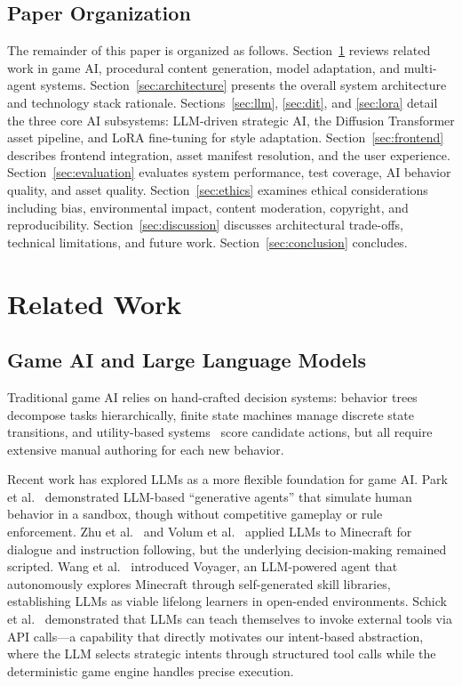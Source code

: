 \documentclass[conference]{IEEEtran}
\begin{document}
\subsection{Paper Organization}

The remainder of this paper is organized as follows. Section~\ref{sec:related} reviews related work in game AI, procedural content generation, model adaptation, and multi-agent systems. Section~\ref{sec:architecture} presents the overall system architecture and technology stack rationale. Sections~\ref{sec:llm}, \ref{sec:dit}, and \ref{sec:lora} detail the three core AI subsystems: LLM-driven strategic AI, the Diffusion Transformer asset pipeline, and LoRA fine-tuning for style adaptation. Section~\ref{sec:frontend} describes frontend integration, asset manifest resolution, and the user experience. Section~\ref{sec:evaluation} evaluates system performance, test coverage, AI behavior quality, and asset quality. Section~\ref{sec:ethics} examines ethical considerations including bias, environmental impact, content moderation, copyright, and reproducibility. Section~\ref{sec:discussion} discusses architectural trade-offs, technical limitations, and future work. Section~\ref{sec:conclusion} concludes.

\section{Related Work}
\label{sec:related}

\subsection{Game AI and Large Language Models}

Traditional game AI relies on hand-crafted decision systems: behavior trees~\cite{mark2012behavior, rabin2013game} decompose tasks hierarchically, finite state machines manage discrete state transitions, and utility-based systems~\cite{mark2015utility} score candidate actions, but all require extensive manual authoring for each new behavior.

Recent work has explored LLMs as a more flexible foundation for game AI. Park et al.~\cite{park2023generative} demonstrated LLM-based ``generative agents'' that simulate human behavior in a sandbox, though without competitive gameplay or rule enforcement. Zhu et al.~\cite{zhu2023ghost} and Volum et al.~\cite{volum2022craft} applied LLMs to Minecraft for dialogue and instruction following, but the underlying decision-making remained scripted. Wang et al.~\cite{wang2023voyager} introduced Voyager, an LLM-powered agent that autonomously explores Minecraft through self-generated skill libraries, establishing LLMs as viable lifelong learners in open-ended environments. Schick et al.~\cite{schick2023toolformer} demonstrated that LLMs can teach themselves to invoke external tools via API calls---a capability that directly motivates our intent-based abstraction, where the LLM selects strategic intents through structured tool calls while the deterministic game engine handles precise execution.
\end{document}
